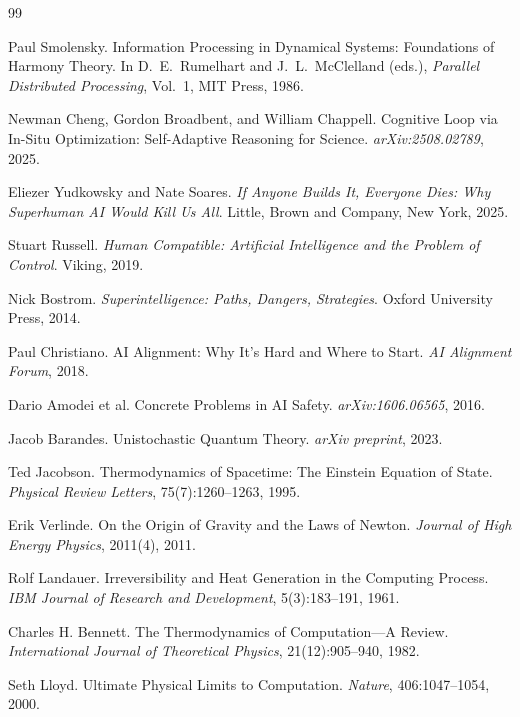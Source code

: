 \documentclass[11pt]{article}
\theoremstyle{plain}
\theoremstyle{definition}
\theoremstyle{remark}
\begin{document}
\begin{thebibliography}{99}

Paul Smolensky.
Information Processing in Dynamical Systems: Foundations of Harmony Theory.
In D.\ E.\ Rumelhart and J.\ L.\ McClelland (eds.),
\textit{Parallel Distributed Processing}, Vol.~1, MIT Press, 1986.

Newman Cheng, Gordon Broadbent, and William Chappell.
Cognitive Loop via In-Situ Optimization: Self-Adaptive Reasoning for Science.
\textit{arXiv:2508.02789}, 2025.

Eliezer Yudkowsky and Nate Soares.
\textit{If Anyone Builds It, Everyone Dies: Why Superhuman AI Would Kill Us All}.
Little, Brown and Company, New York, 2025.

Stuart Russell.
\textit{Human Compatible: Artificial Intelligence and the Problem of Control}.
Viking, 2019.

Nick Bostrom.
\textit{Superintelligence: Paths, Dangers, Strategies}.
Oxford University Press, 2014.

Paul Christiano.
AI Alignment: Why It's Hard and Where to Start.
\textit{AI Alignment Forum}, 2018.

Dario Amodei et al.
Concrete Problems in AI Safety.
\textit{arXiv:1606.06565}, 2016.

Jacob Barandes.
Unistochastic Quantum Theory.
\textit{arXiv preprint}, 2023.

Ted Jacobson.
Thermodynamics of Spacetime: The Einstein Equation of State.
\textit{Physical Review Letters}, 75(7):1260--1263, 1995.

Erik Verlinde.
On the Origin of Gravity and the Laws of Newton.
\textit{Journal of High Energy Physics}, 2011(4), 2011.

Rolf Landauer.
Irreversibility and Heat Generation in the Computing Process.
\textit{IBM Journal of Research and Development}, 5(3):183--191, 1961.

Charles H. Bennett.
The Thermodynamics of Computation---A Review.
\textit{International Journal of Theoretical Physics}, 21(12):905--940, 1982.

Seth Lloyd.
Ultimate Physical Limits to Computation.
\textit{Nature}, 406:1047--1054, 2000.


\end{thebibliography}
\end{document}
